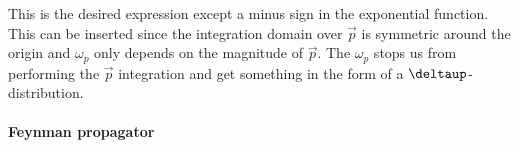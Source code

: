 \documentclass[11pt, english, fleqn, DIV=15, headinclude, BCOR=1cm]{scrartcl}
\begin{document}
This is the desired expression except a minus sign in the exponential function.
This can be inserted since the integration domain over $\vec p$ is symmetric
around the origin and $\omega_p$ only depends on the magnitude of $\vec p$. The
$\omega_p$ stops us from performing the $\vec p$ integration and get something
in the form of a $\deltaup$-distribution.

\paragraph{Feynman propagator}

\end{document}
